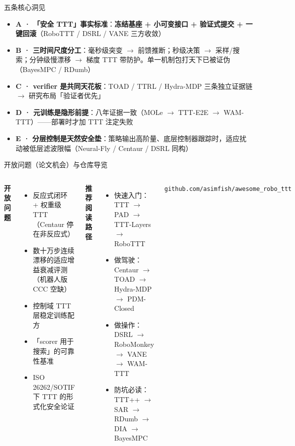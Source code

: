 \documentclass[10pt,aspectratio=169]{beamer}
\newcommand{\hl}[1]{\textcolor{good}{\textbf{#1}}}
\begin{document}
\begin{frame}{五条核心洞见}
\small
\begin{itemize}
\item \textbf{A · 「安全 TTT」事实标准}：\hl{冻结基座 + 小可变接口 + 验证式提交 + 一键回滚}（RoboTTT / DSRL / VANE 三方收敛）
\item \textbf{B · 三时间尺度分工}：毫秒级突变 $\to$ 前馈推断；秒级决策 $\to$ 采样/搜索；分钟级慢漂移 $\to$ 梯度 TTT 带防护。单一机制包打天下已被证伪（BayesMPC / RDumb）
\item \textbf{C · verifier 是共同天花板}：TOAD / TTRL / Hydra-MDP 三条独立证据链 $\to$ 研究布局「验证者优先」
\item \textbf{D · 元训练是隐形前提}：八年证据一致（MOLe $\to$ TTT-E2E $\to$ WAM-TTT）——部署时才加 TTT 注定失败
\item \textbf{E · 分层控制是天然安全垫}：策略输出高阶量、底层控制器跟踪时，适应扰动被低层滤波限幅（Neural-Fly / Centaur / DSRL 同构）
\end{itemize}
\end{frame}

\begin{frame}{开放问题（论文机会）与仓库导览}
\begin{columns}[T]
\textbf{开放问题}
\begin{itemize}
\item 反应式闭环 + 权重级 TTT（Centaur 停在非反应式）
\item 数十万步连续漂移的适应增益衰减评测（机器人版 CCC 空缺）
\item 控制域 TTT 层稳定训练配方
\item 「scorer 用于搜索」的可靠性基准
\item ISO 26262/SOTIF 下 TTT 的形式化安全论证
\end{itemize}
\textbf{推荐阅读路径}
\begin{itemize}
\item 快速入门：TTT $\to$ PAD $\to$ TTT-Layers $\to$ RoboTTT
\item 做驾驶：Centaur $\to$ TOAD $\to$ Hydra-MDP $\to$ PDM-Closed
\item 做操作：DSRL $\to$ RoboMonkey $\to$ VANE $\to$ WAM-TTT
\item 防坑必读：TTT++ $\to$ SAR $\to$ RDumb $\to$ DIA $\to$ BayesMPC
\end{itemize}
\vspace{4pt}
\centering
\texttt{github.com/asimfish/awesome\_robo\_ttt}
\end{columns}
\end{frame}
\end{document}
